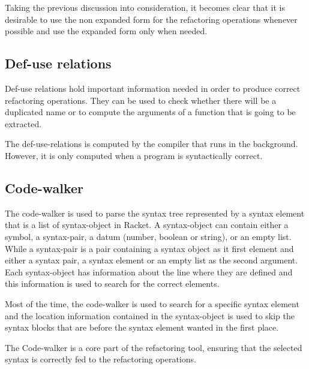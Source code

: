 Taking the previous discussion into consideration, it becomes clear
that it is desirable to use the non expanded form for the
refactoring %
operations whenever possible and use the expanded form only when
needed.%


\subsection{Def-use relations}
Def-use relations hold important information needed in order to
produce correct refactoring operations.  They can be used to check
whether there will be a duplicated name or to compute the arguments of
a function that is going to be extracted.

The def-use-relations is computed by the %
compiler that runs in the background.  However, it is only computed
when a program is syntactically correct.

\subsection{Code-walker}
The code-walker is used to parse the syntax tree represented by a
syntax element that is a list of syntax-object in Racket.  A
syntax-object can contain either a symbol, a syntax-pair, a datum
(number, boolean or string), or an empty list.  While a syntax-pair is
a pair containing a syntax object as it first element and either a
syntax pair, a syntax element or an empty list as the second argument.
Each syntax-object has information about the line where they are
defined and this information is used to search for the correct
elements.


Most of the time, the code-walker is used to search for a specific
syntax element and the location information contained in the
syntax-object is used to skip the syntax blocks that are before the
syntax element wanted in the first place.

The Code-walker is a core part of the refactoring tool, ensuring that
the selected syntax is correctly fed to the refactoring
operations. %


